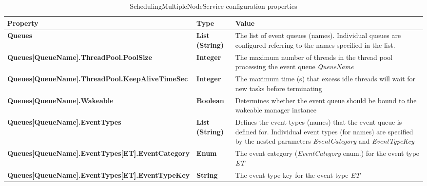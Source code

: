 \begin{table}
\scriptsize
\begin{center}
\begin{tabular}{p{6.3cm} p{0.9cm} p{7.3cm}}
	\hline
	\textbf{Property}											& \textbf{Type}						& \textbf{Value}					\\[1mm]
    \hline
	\textbf{Queues}												& \textbf{List (String)}			& The list of event queues (names). Individual queues are configured referring to the names specified in the list.		\\[1.5mm]	
	\textbf{Queues[QueueName].ThreadPool.PoolSize}				& \textbf{Integer}					& The maximum number of threads in the thread pool processing the event queue \emph{QueueName}		\\[1.5mm]	
	\textbf{Queues[QueueName].ThreadPool.KeepAliveTimeSec}		& \textbf{Integer}					& The maximum time (s) that excess idle threads will wait for new tasks before terminating			\\[1.5mm]	
	\textbf{Queues[QueueName].Wakeable}							& \textbf{Boolean}					& Determines whether the event queue should be bound to the wakeable manager instance					\\[1.5mm]	
	\textbf{Queues[QueueName].EventTypes}						& \textbf{List (String)}			& Defines the event types (names) that the event queue is defined for. Individual event types (for names) are specified by the nested parameters \emph{EventCategory} and \emph{EventTypeKey}			\\[1.5mm]	
	\textbf{Queues[QueueName].EventTypes[ET].EventCategory}		& \textbf{Enum}					& The event category (\emph{EventCategory} enum.) for the event type \emph{ET}						\\[1.5mm]	
	\textbf{Queues[QueueName].EventTypes[ET].EventTypeKey}		& \textbf{String}					& The event type key for the event type \emph{ET}						\\[1.5mm]	
    \hline
\end{tabular}
\end{center}
\caption{SchedulingMultipleNodeService configuration properties}
\label{tab:libSchedulingMultipleNodeService}
\end{table}
















